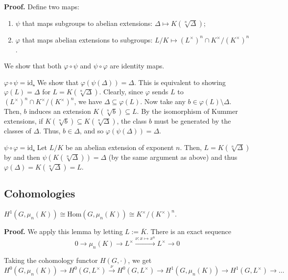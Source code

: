 \documentclass{template}
\begin{document}
\textbf{Proof.} Define two maps:
\begin{enumerate}
    \item $\psi$ that maps subgroups to abelian extensions: $\Delta \mapsto K(\sqrt[n]{\Delta})$;
    \item $\varphi$ that maps abelian extensions to subgroups: $L/K \mapsto (L^{\times})^n \cap K^{\times}/(K^{\times})^n$.
\end{enumerate}

We show that both $\varphi \circ \psi$ and $\psi \circ \varphi$ are identity maps. 

\underline{$\varphi \circ \psi = \text{id}$.} We show that
$\varphi(\psi(\Delta)) = \Delta$. This is equivalent to showing $\varphi(L) =
\Delta$ for $L=K(\sqrt[n]{\Delta})$. Clearly, since $\varphi$ sends $L$ to
$(L^{\times})^n \cap K^{\times}/(K^{\times})^n$, we have $\Delta \subseteq
\varphi(L)$. Now take any $b \in \varphi(L) \setminus \Delta$. Then, $b$ induces
an extension $K(\sqrt[n]{b}) \subseteq L$. By the isomorphism of Kummer
extensions, if $K(\sqrt[n]{b}) \subseteq K(\sqrt[n]{\Delta})$, the class $b$
must be generated by the classes of $\Delta$. Thus, $b \in \Delta$, and so
$\varphi(\psi(\Delta)) = \Delta$.

\underline{$\psi \circ \varphi = \text{id}$.} Let $L/K$ be an abelian extension
of exponent $n$. Then, $L=K(\sqrt[n]{\Delta})$ by
 and then $\psi(K(\sqrt[n]{\Delta})) = \Delta$
(by the same argument as above) and thus $\varphi(\Delta) = K(\sqrt[n]{\Delta})
= L$.

\subsection{Cohomologies}

\begin{lemma}
    $H^1(G, \mu_n(K)) \cong \text{Hom}(G, \mu_n(K)) \cong K^{\times}/(K^{\times})^n$.
\end{lemma}

\textbf{Proof.} We apply this lemma by letting $L := \overline{K}$. There is an
exact sequence
\begin{equation*}
    0 \to \mu_n(K) \to L^{\times} \xrightarrow{\nu: x \mapsto x^n} L^{\times} \to 0
\end{equation*}

Taking the cohomology functor $H(G, \cdot)$, we get
\begin{equation*}
    H^0(G, \mu_n(K)) \to H^0(G, L^{\times}) \xrightarrow{\nu} 
    H^0(G, L^{\times}) \to H^1(G, \mu_n(K)) \to H^1(G, L^{\times}) \to \dots
\end{equation*}
\end{document}
